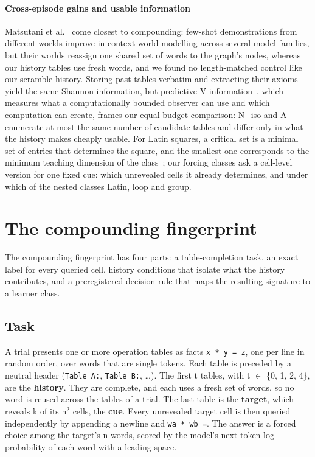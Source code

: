 \documentclass[11pt]{article}
\begin{document}
\paragraph{Cross-episode gains and usable information}

Matsutani et al.~\cite{matsutani2026} come closest to compounding: few-shot demonstrations from different worlds improve in-context world modelling across several model families, but their worlds reassign one shared set of words to the graph's nodes, whereas our history tables use fresh words, and we found no length-matched control like our scramble history. Storing past tables verbatim and extracting their axioms yield the same Shannon information, but predictive V-information~\cite{xu2020usable}, which measures what a computationally bounded observer can use and which computation can create, frames our equal-budget comparison: N\_iso and A enumerate at most the same number of candidate tables and differ only in what the history makes cheaply usable. For Latin squares, a critical set is a minimal set of entries that determines the square, and the smallest one corresponds to the minimum teaching dimension of the class~\cite{hatami2016}; our forcing classes ask a cell-level version for one fixed cue: which unrevealed cells it already determines, and under which of the nested classes Latin, loop and group.

\section{The compounding fingerprint}\label{sec:fingerprint}

The compounding fingerprint has four parts: a table-completion task, an exact label for every queried cell, history conditions that isolate what the history contributes, and a preregistered decision rule that maps the resulting signature to a learner class.

\subsection{Task}\label{sec:task}

A trial presents one or more operation tables as facts \texttt{x * y = z}, one per line in random order, over words that are single tokens. Each table is preceded by a neutral header (\texttt{Table A:}, \texttt{Table B:}, \ldots{}). The first t tables, with t $\in$ \{0, 1, 2, 4\}, are the \textbf{history}. They are complete, and each uses a fresh set of words, so no word is reused across the tables of a trial. The last table is the \textbf{target}, which reveals k of its n$^{2}$ cells, the \textbf{cue}. Every unrevealed target cell is then queried independently by appending a newline and \texttt{wa * wb =}. The answer is a forced choice among the target's n words, scored by the model's next-token log-probability of each word with a leading space.
\end{document}
